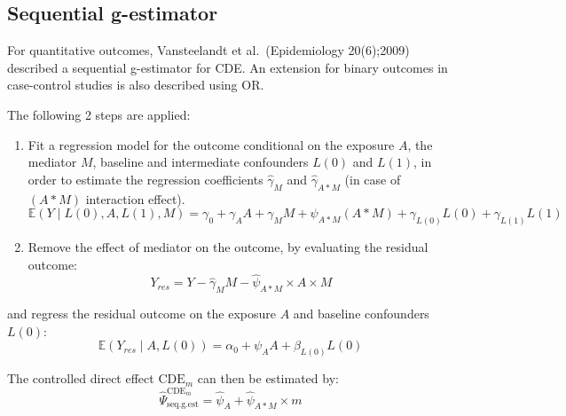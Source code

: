 \documentclass[
]{book}
\begin{document}
\subsection{Sequential g-estimator}\label{sequential-g-estimator}

For quantitative outcomes, Vansteelandt et al.~(Epidemiology 20(6);2009) described a sequential g-estimator for CDE. An extension for binary outcomes in case-control studies is also described using OR.

The following 2 steps are applied:

\begin{enumerate}
\def\labelenumi{\arabic{enumi}.}
\item
  Fit a regression model for the outcome conditional on the exposure \(A\), the mediator \(M\), baseline and intermediate confounders \(L(0)\) and \(L(1)\), in order to estimate the regression coefficients \(\hat{\gamma}_{M}\) and \(\hat{\gamma}_{A \ast M}\) (in case of \((A \ast M)\) interaction effect).
  \begin{equation}
  \mathbb{E}(Y\mid L(0),A,L(1),M) = \gamma_0 + \gamma_A A + \gamma_M M + \psi_{A \ast M} (A \ast M) + \gamma_{L(0)} L(0) + \gamma_{L(1)} L(1)
  \end{equation}
\item
  Remove the effect of mediator on the outcome, by evaluating the residual outcome:
  \begin{equation}
  Y_{res} = Y - \hat{\gamma}_M M - \hat{\psi}_{A \ast M} \times A \times M
  \end{equation}
\end{enumerate}

and regress the residual outcome on the exposure \(A\) and baseline confounders \(L(0)\):
\begin{equation}
\mathbb{E}(Y_{res}\mid A, L(0)) = \alpha_0 + \psi_A A + \beta_{L(0)} L(0)
\end{equation}

The controlled direct effect \(\text{CDE}_m\) can then be estimated by:
\begin{equation}
\hat{\Psi}^{\text{CDE}_m}_{\text{seq.g.est}} = \hat{\psi}_A + \hat{\psi}_{A \ast M} \times m
\end{equation}
\end{document}
